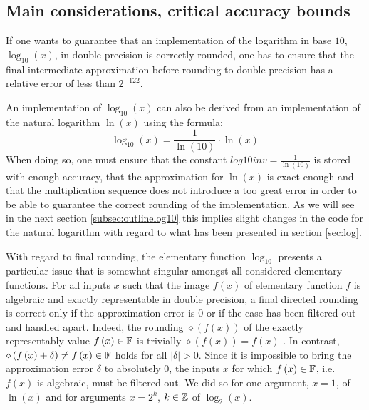 \subsection{Main considerations, critical accuracy bounds}\label{subsec:criticalboundslog10}
% 
If one wants to guarantee that an implementation of the logarithm in
base $10$, $\log_{10}\left( x \right)$, in double precision is
correctly rounded, one has to ensure that the final intermediate
approximation before rounding to double precision has a relative error
of less than $2^{-122}$.

An implementation of $\log_{10}\left(x\right)$ can also be derived from an
implementation of the natural logarithm $\ln\left(x\right)$ using the formula:
$$\log_{10}\left( x \right) = \frac{1}{\ln\left( 10 \right)} \cdot
\ln\left( x \right)$$ When doing so, one must ensure that the constant
$\mathit{log10inv} = \frac{1}{\ln\left(10\right)}$ is stored with
enough accuracy, that the approximation for $\ln\left( x \right)$ is
exact enough and that the multiplication sequence does not introduce a
too great error in order to be able to guarantee the correct rounding
of the implementation. As we will see in the next section
\ref{subsec:outlinelog10} this implies slight changes in the code for
the natural logarithm with regard to what has been presented in
section \ref{sec:log}.

With regard to final rounding, the elementary function $\log_{10}$
presents a particular issue that is somewhat singular amongst all
considered elementary functions. For all inputs $x$ such that the
image $f\left(x\right)$ of elementary function $f$ is algebraic and
exactly representable in double precision, a final directed rounding
is correct only if the approximation error is $0$ or if the case has
been filtered out and handled apart. Indeed, the rounding
$\diamond\left( f\left( x \right) \right)$ of the exactly
representably value $f\left(x\right) \in \mathbb {F}$ is trivially
$\diamond\left( f\left( x \right) \right) = f\left( x \right)$
\cite{ieee754}. In contrast, $\diamond\left( f\left( x \right) +
\delta \right) \not = f\left( x \right) \in \mathbb {F}$ holds for all $\left
\vert \delta \right \vert > 0$. Since it is impossible to bring the
approximation error $\delta$ to absolutely $0$, the inputs $x$ for
which $f\left(x\right) \in \mathbb {F}$, i.e. $f\left(x\right)$ is algebraic,
must be filtered out. We did so for one argument, $x=1$, of $\ln\left(
x \right)$ and for arguments $x = 2^k$, $k \in \mathbb {Z}$ of $\log_2\left(
x\right)$.

